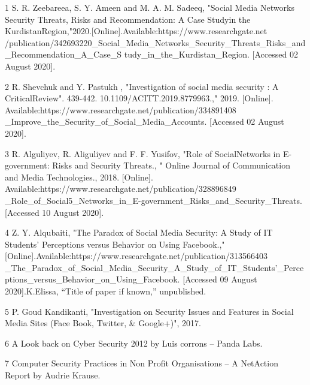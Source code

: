 \documentclass[11pt,a4paper,oneside]{report}
\begin{document}
		
		
		
		
		
		
		
		\tableofcontents
		\newpage
		\listoffigures
		\newpage	
		
		
		
		
		
		
		
		
		
		
		
		
		
		\footnotesize
		\renewcommand\bibname{References}
		\begin{thebibliography}{}
			\item[1] S. R. Zeebareea, S. Y. Ameen and M. A. M. Sadeeq, "Social Media Networks Security Threats, Risks and Recommendation: A Case Studyin the KurdistanRegion,"2020.[Online].Available:https://www.researchgate.net
			/publication/342693220\_Social\_Media\_Networks\_Security\_Threats\_Risks\_and\_Recommendation\_A\_Case\_S
			tudy\_in\_the\_Kurdistan\_Region. [Accessed 02 August 2020]. \\
			
			\item[2] R. Shevchuk and Y. Pastukh , "Investigation of social media security :
			A CriticalReview". 439-442. 10.1109/ACITT.2019.8779963.," 2019. [Online].
			Available:https://www.researchgate.net/publication/334891408
			\_Improve\_the\_Security\_of\_Social\_Media\_Accounts.
			[Accessed 02 August 2020].\\
			
			\item[3]  R. Alguliyev, R. Aliguliyev and F. F. Yusifov,
			"Role of SocialNetworks in E-government: Risks and Security Threats.,
			" Online Journal of Communication and Media Technologies., 2018. [Online].
			Available:https://www.researchgate.net/publication/328896849
			\_Role\_of\_Social5\_Networks\_in\_E-government\_Risks\_and\_Security\_Threats.[Accessed 10 August 2020]. \\
			
			\item[4] Z. Y. Alqubaiti, "The Paradox of Social Media Security: A Study of IT
			Students’ Perceptions versus Behavior on Using Facebook.," [Online].Available:https://www.researchgate.net/publication/313566403
			\_The\_Paradox\_of\_Social\_Media\_Security\_A\_Study\_of\_IT\_Students'\_Perceptions\_versus\_Behavior\_on\_Using\_Facebook. [Accessed 09 August 2020].K.Elissa, “Title of paper if known,” unpublished.\\
			\item[5] P. Goud Kandikanti, "Investigation on Security Issues and Features in
			Social Media Sites (Face Book, Twitter, \& Google+)", 2017. \\
			
			\item[6] A Look back on Cyber Security 2012 by Luis corrons – Panda Labs. \\
			
			
			\item[7] Computer Security Practices in Non Profit Organisations – A NetAction Report by Audrie Krause.
			\\
		\end{thebibliography}
		
		
		
	
\end{document}
